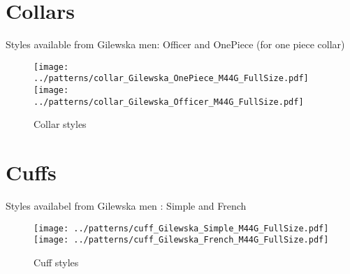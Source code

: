 \documentclass[11pt,a4paper]{article}
\begin{document}
\section{Collars}
Styles available from Gilewska men: Officer and OnePiece (for one piece collar)

\begin{figure}
\begin{center}
\texttt{[image: ../patterns/collar\_Gilewska\_OnePiece\_M44G\_FullSize.pdf]} 
\texttt{[image: ../patterns/collar\_Gilewska\_Officer\_M44G\_FullSize.pdf]} 
\end{center}
\caption{Collar styles}
\end{figure}


\section{Cuffs}
Styles availabel from Gilewska men : Simple and French

\begin{figure}
\begin{center}
\texttt{[image: ../patterns/cuff\_Gilewska\_Simple\_M44G\_FullSize.pdf]} 
\texttt{[image: ../patterns/cuff\_Gilewska\_French\_M44G\_FullSize.pdf]} 
\end{center}
\caption{Cuff styles}
\end{figure}
\end{document}
